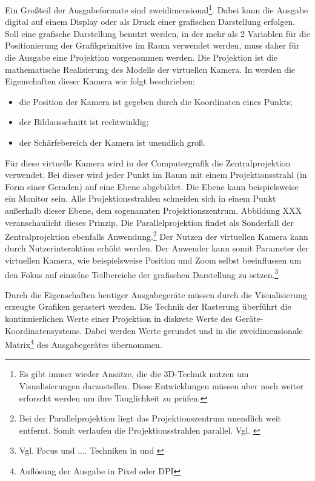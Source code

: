 \documentclass[a4paper, 12pt, DIVcalc, onepage, pdftex, headsepline, footsepline]{scrreprt}
\begin{document}
Ein Großteil der Ausgabeformate sind zweidimensional\footnote{Es gibt immer wieder
Ansätze, die die 3D-Technik nutzen um Visualisierungen darzustellen. Diese Entwicklungen
müssen aber noch weiter erforscht werden um ihre Tauglichkeit zu prüfen.}. Dabei kann
die Ausgabe digital auf einem Display oder als Druck einer grafischen Darstellung
erfolgen. Soll eine grafische Darstellung benutzt werden, in der mehr als 2 Variablen
für die Positionierung der Grafikprimitive im Raum verwendet werden, muss daher für die
Ausgabe eine Projektion vorgenommen werden. Die Projektion ist die mathematische
Realisierung des Modells der virtuellen Kamera. In \citep[S.\,26]{Computergrafik} werden die 
Eigenschaften dieser Kamera wie folgt beschrieben:
\begin{itemize}
\item die Position der Kamera ist gegeben durch die Koordinaten eines Punkts;
\item der Bildausschnitt ist rechtwinklig;
\item der Schärfebereich der Kamera ist unendlich groß.
\end{itemize}
Für diese virtuelle Kamera wird in der Computergrafik die Zentralprojektion verwendet.
Bei dieser wird jeder Punkt im Raum mit einem Projektionsstrahl (in Form einer Geraden)
auf eine Ebene abgebildet. Die Ebene kann beispielsweise ein Monitor sein. Alle 
Projektionsstrahlen schneiden sich in einem Punkt außerhalb dieser Ebene, dem sogenannten
Projektionszentrum. Abbildung XXX veranschaulicht dieses Prinzip. Die Parallelprojektion
findet als Sonderfall der Zentralprojektion ebenfalls Anwendung.\footnote{Bei der
Parallelprojektion liegt das Projektionszentrum unendlich weit entfernt. Somit verlaufen
die Projektionsstrahlen parallel. Vgl. \citep{wiki_projektion}} Der Nutzen der virtuellen
Kamera kann durch Nutzerinteraktion erhöht werden. Der Anwender kann somit Parameter der
virtuellen Kamera, wie beispielsweise Position und Zoom selbst beeinflussen um den Fokus
auf einzelne Teilbereiche der grafischen Darstellung zu setzen.\footnote{Vgl. Focus und
.... Techniken in \citep[S.\,1]{Schumann} und \citep[S.\,1]{Preim}}

Durch die Eigenschaften heutiger Ausgabegeräte müssen durch die Visualisierung erzeugte
Grafiken gerastert werden. Die Technik der Rasterung überführt die kontinuierlichen Werte
einer Projektion in diskrete Werte des Geräte-Koordinatensystems. Dabei werden Werte
gerundet und in die zweidimensionale Matrix\footnote{Auflösung der Ausgabe in Pixel oder DPI}
des Ausgabegerätes übernommen.
\end{document}
